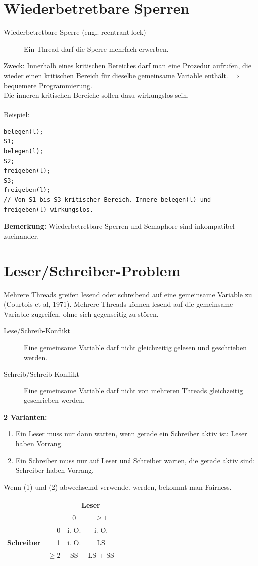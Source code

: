 \section{Wiederbetretbare Sperren}
\begin{description}
	\item[Wiederbetretbare Sperre (engl. reentrant lock)] Ein Thread darf die Sperre mehrfach erwerben.
\end{description}
Zweck: Innerhalb eines kritischen Bereiches darf man eine Prozedur aufrufen, die wieder einen kritischen Bereich für dieselbe gemeinsame Variable enthält. $\Rightarrow$ bequemere Programmierung.\\
Die inneren kritischen Bereiche sollen dazu wirkungslos sein.\\
\\
Beispiel:
\begin{lstlisting}
belegen(l);
S1;
belegen(l);
S2;
freigeben(l);
S3;
freigeben(l);
// Von S1 bis S3 kritischer Bereich. Innere belegen(l) und freigeben(l) wirkungslos.
\end{lstlisting}
\textbf{Bemerkung:} Wiederbetretbare Sperren und Semaphore sind inkompatibel zueinander.

\section{Leser/Schreiber-Problem}
Mehrere Threads greifen lesend oder schreibend auf eine gemeinsame Variable zu (Courtois et al, 1971). Mehrere Threads können lesend auf die gemeinsame Variable zugreifen, ohne sich gegenseitig zu stören.

\begin{description}
	\item[Lese/Schreib-Konflikt] Eine gemeinsame Variable darf nicht gleichzeitig gelesen und geschrieben werden.
	\item[Schreib/Schreib-Konflikt] Eine gemeinsame Variable darf nicht von mehreren Threads gleichzeitig geschrieben werden.
\end{description}

\textbf{2 Varianten:}
\begin{enumerate}
	\item Ein Leser muss nur dann warten, wenn gerade ein Schreiber aktiv ist: Leser haben Vorrang.
	\item Ein Schreiber muss nur auf Leser und Schreiber warten, die gerade aktiv sind: Schreiber haben Vorrang.
\end{enumerate}
Wenn (1) und (2) abwechselnd verwendet werden, bekommt man Fairness.
\begin{center}
	\begin{tabular}{l r|c c}
		\ & \ & \multicolumn{2}{c}{\textbf{Leser}} \\ 
		\ & \ & 0 & $\geq 1$ \\ \hline
		\multirow{3}{*}{\textbf{Schreiber}} & 0 & i. O. & i. O. \\
		\ & 1 & i. O. & LS \\
		\ & $\geq 2$ & SS & LS + SS
	\end{tabular}
\end{center}